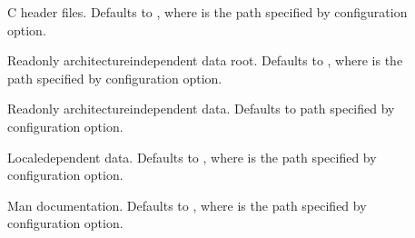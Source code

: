 \documentclass[letterpaper,10pt,english]{sphinxmanual}
\begin{document}
\begin{description}
\item[{\sphinxstylestrong{\sphinxhyphen{}}}] \leavevmode
\sphinxAtStartPar
C header files.  Defaults to , where  is
the path specified by \sphinxstylestrong{\sphinxhyphen{}} configuration option.

\item[{\sphinxstylestrong{\sphinxhyphen{}}}] \leavevmode
\sphinxAtStartPar
Read\sphinxhyphen{}only architecture\sphinxhyphen{}independent data root.  Defaults to
, where  is the path specified by
\sphinxstylestrong{\sphinxhyphen{}} configuration option.

\item[{\sphinxstylestrong{\sphinxhyphen{}}}] \leavevmode
\sphinxAtStartPar
Read\sphinxhyphen{}only architecture\sphinxhyphen{}independent data.  Defaults to path
specified by \sphinxstylestrong{\sphinxhyphen{}} configuration option.

\item[{\sphinxstylestrong{\sphinxhyphen{}}}] \leavevmode
\sphinxAtStartPar
Locale\sphinxhyphen{}dependent data.  Defaults to , where
 is the path specified by \sphinxstylestrong{\sphinxhyphen{}}
configuration option.

\item[{\sphinxstylestrong{\sphinxhyphen{}}}] \leavevmode
\sphinxAtStartPar
Man documentation.  Defaults to , where
 is the path specified by \sphinxstylestrong{\sphinxhyphen{}}
configuration option.

\end{description}
\end{document}
